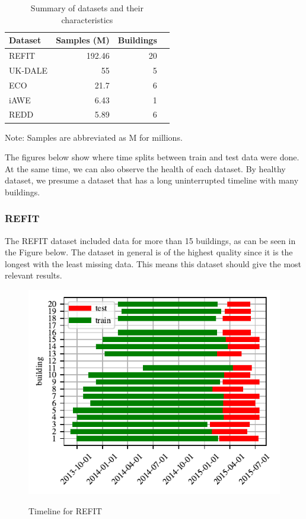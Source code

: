 \begin{table}[H]
    \caption{Summary of datasets and their characteristics}
    \centering
    \begin{tabular}{lrrr}
        \toprule
        \textbf{Dataset} & \textbf{Samples (M)} & \textbf{Buildings} \\
        \midrule
        REFIT   &   192.46 & 20 \\
        UK-DALE &   55     &  5 \\
        ECO     &   21.7   &  6 \\
        iAWE    &   6.43   &  1 \\
        REDD    &   5.89   &  6 \\
        \bottomrule
    \end{tabular}
    \label{tab:dataset_analysis}
    \par\footnotesize{Note: Samples are abbreviated as M for millions.}
\end{table}

The figures below show where time splits between train and test data were done.
At the same time, we can also observe the health of each dataset.
By healthy dataset, we presume a dataset that has a long uninterrupted timeline with many buildings.


\subsubsection{REFIT}
The REFIT \cite{REFIT} dataset included data for more than 15 buildings, as can be seen in the Figure below.
The dataset in general is of the highest quality since it is the longest with the least missing data.
This means this dataset should give the most relevant results.
\begin{figure}[H]
	\centering
	\caption{Timeline for REFIT}
	\includegraphics[]{Figures/EC/refit_timeline.pdf}
	\label{fig:refit_timeline}
\end{figure}

